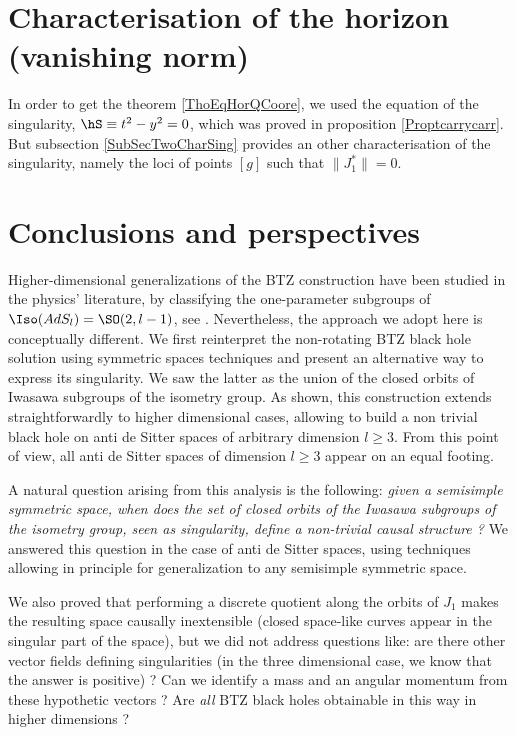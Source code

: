 \section{Characterisation of the horizon (vanishing norm)}
\label{SecVanNormChar}

In order to get the theorem \ref{ThoEqHorQCoore}, we used the equation of the singularity, $\hS\equiv t^2-y^2=0$, which was proved in proposition \ref{Proptcarrycarr}. But subsection \ref{SubSecTwoCharSing} provides an other characterisation of the singularity, namely the loci of points $[g]$ such that $\| J_1^* \|=0$.

\section{Conclusions and perspectives}		\label{SecConcPerspAd}

Higher-dimensional generalizations of the BTZ construction have been studied in the physics' literature, by classifying the one-parameter subgroups of $\Iso(AdS_l)=\SO(2,l-1)$, see \cite{Figueroa,AdSBH,Madden,Banados:1997df,Aminneborg,HolstPeldan}.  Nevertheless, the approach we adopt here is conceptually different. We first reinterpret the non-rotating BTZ black hole solution using symmetric spaces techniques and present an alternative way to express its singularity.  We saw the latter as the union of the closed orbits of Iwasawa subgroups of the isometry group.  As shown, this construction extends straightforwardly to higher dimensional cases, allowing to build a non trivial black hole on anti de Sitter spaces of arbitrary dimension $l\geq 3$.  From this point of view, all anti de Sitter spaces of dimension $l\geq 3$ appear on an equal footing.

A natural question arising from this analysis is the following: \emph{given a semisimple symmetric space, when does the set of closed orbits of the Iwasawa subgroups of the isometry group, seen as singularity, define a non-trivial causal structure ?} We answered this question in the case of anti de Sitter spaces, using techniques allowing in principle for generalization to any semisimple symmetric space.

We also proved that performing a discrete quotient along the orbits of $J_1$ makes the resulting space causally inextensible (closed space-like curves appear in the singular part of the space), but we did not address  questions like: are there other vector fields defining singularities (in the three dimensional case, we know that the answer is positive) ? Can we identify a mass and an angular momentum from these hypothetic vectors ? Are \emph{all} BTZ black holes obtainable in this way in higher dimensions ?
